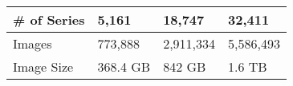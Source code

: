 \documentclass{beamer}
\begin{document}
\begin{frame}
\begin{table}[h]
{\begin{tabular}{|p{3cm}|p{2.5cm}|p{2.5cm}|p{2.5cm}|}
                    \hline
                    \# of Series       & 5,161                                                                                                                                                           & 18,747                                                                                                                                                                & 32,411                                                                                                                                                           \\
                    \hline
                    Images             & 773,888                                                                                                                                                         & 2,911,334                                                                                                                                                             & 5,586,493                                                                                                                                                        \\
                    \hline
                    Image Size         & 368.4 GB                                                                                                                                                        & 842 GB                                                                                                                                                                & 1.6 TB                                                                                                                                                           \\
                    \hline
                \end{tabular}
            }
        \end{table}
    \end{frame}
\end{document}

